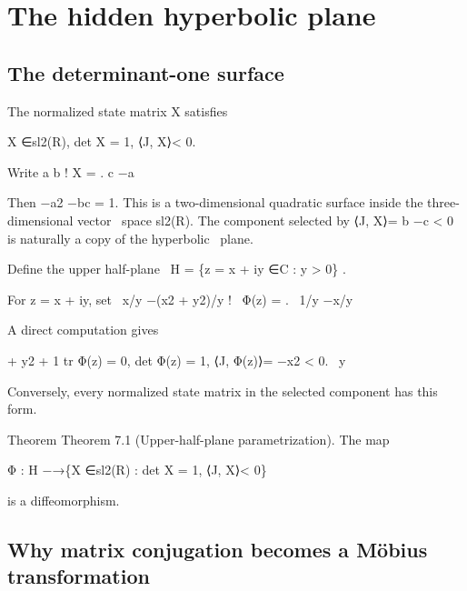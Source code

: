 \chapter{The hidden hyperbolic plane}
\section{The determinant-one surface}

The normalized state matrix X satisfies


\begin{displaytext}
X ∈sl2(R), det X = 1, ⟨J, X⟩< 0.
\end{displaytext}

Write a b ! X = . c −a


\begin{displaytext}
Then −a2 −bc = 1. This is a two-dimensional quadratic surface inside the three-dimensional vector \
space sl2(R). The component selected by ⟨J, X⟩= b −c < 0 is naturally a copy of the hyperbolic \
plane.
\end{displaytext}

\begin{displaytext}
Define the upper half-plane \
H = \{z = x + iy ∈C : y > 0\} .
\end{displaytext}

\begin{displaytext}
For z = x + iy, set \
x/y −(x2 + y2)/y ! \
Φ(z) = . \
1/y −x/y
\end{displaytext}

A direct computation gives


\begin{displaytext}
+ y2 + 1 tr Φ(z) = 0, det Φ(z) = 1, ⟨J, Φ(z)⟩= −x2 < 0. \
y
\end{displaytext}

Conversely, every normalized state matrix in the selected component has this form.


\begin{statementbox}{Theorem}
Theorem 7.1 (Upper-half-plane parametrization). The map
\end{statementbox}

\begin{displaytext}
Φ : H −→\{X ∈sl2(R) : det X = 1, ⟨J, X⟩< 0\}
\end{displaytext}

is a diffeomorphism.


\section{Why matrix conjugation becomes a Möbius transformation}

